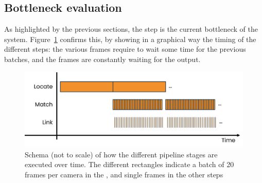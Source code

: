 \subsection{Bottleneck evaluation}

As highlighted by the previous sections, the \locate* step is the current bottleneck of the system.
Figure~\ref{fig:pipeline-timing-schema} confirms this, by showing in a graphical way the timing of the different steps: the various \match* frames require to wait some time for the previous \locate* batches, and the \link* frames are constantly waiting for the \locate* output.

\begin{figure}[H]
	\centerline{\includegraphics[width=.8\textwidth]{images/pipeline-timing.png}}
	\caption{\centering Schema (not to scale) of how the different pipeline stages are executed over time. The different rectangles indicate a batch of 20 frames per camera in the \locate*, and single frames in the other steps}
	\label{fig:pipeline-timing-schema}
\end{figure}
\newpage
